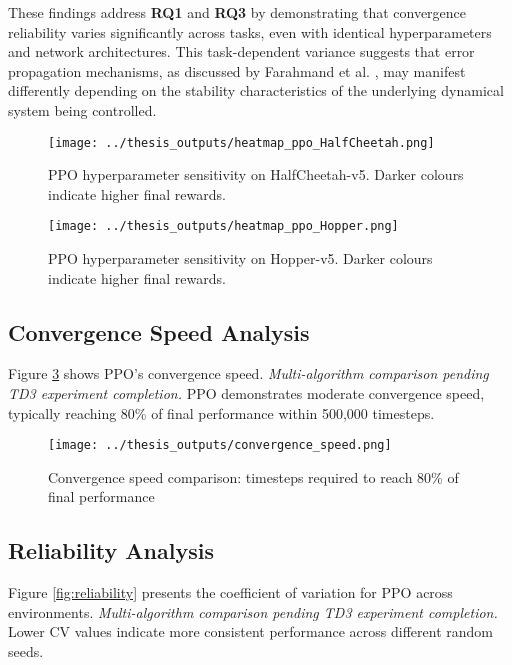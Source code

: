 \documentclass[12pt,a4paper]{report}
\begin{document}
These findings address \textbf{RQ1} and \textbf{RQ3} by demonstrating that convergence reliability varies significantly across tasks, even with identical hyperparameters and network architectures. This task-dependent variance suggests that error propagation mechanisms, as discussed by Farahmand et al. \cite{farahmand2010error}, may manifest differently depending on the stability characteristics of the underlying dynamical system being controlled.

\begin{figure}[h]
\centering
\texttt{[image: ../thesis\_outputs/heatmap\_ppo\_HalfCheetah.png]}
\caption{PPO hyperparameter sensitivity on HalfCheetah-v5. Darker colours indicate higher final rewards.}
\label{fig:ppo_heatmap_cheetah}
\end{figure}

\begin{figure}[h]
\centering
\texttt{[image: ../thesis\_outputs/heatmap\_ppo\_Hopper.png]}
\caption{PPO hyperparameter sensitivity on Hopper-v5. Darker colours indicate higher final rewards.}
\label{fig:ppo_heatmap_hopper}
\end{figure}

\subsection{Convergence Speed Analysis}

Figure \ref{fig:convergence} shows PPO's convergence speed. \textit{Multi-algorithm comparison pending TD3 experiment completion.} PPO demonstrates moderate convergence speed, typically reaching 80\% of final performance within 500,000 timesteps.

\begin{figure}[h]
\centering
\texttt{[image: ../thesis\_outputs/convergence\_speed.png]}
\caption{Convergence speed comparison: timesteps required to reach 80\% of final performance}
\label{fig:convergence}
\end{figure}

\subsection{Reliability Analysis}

Figure \ref{fig:reliability} presents the coefficient of variation for PPO across environments. \textit{Multi-algorithm comparison pending TD3 experiment completion.} Lower CV values indicate more consistent performance across different random seeds.
\end{document}
